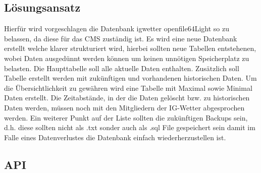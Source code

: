 \subsection{Lösungsansatz}
Hierfür wird vorgeschlagen die Datenbank igwetter openfile64Light so zu belassen, da diese für das CMS zuständig ist. Es wird eine neue Datenbank erstellt welche klarer strukturiert wird, hierbei sollten neue Tabellen entstehenen, wobei Daten ausgedünnt werden können um keinen unnötigen Speicherplatz zu belasten. Die Haupttabelle soll alle aktuelle Daten enthalten. Zusätzlich soll Tabelle erstellt werden mit zukünftigen und vorhandenen historischen Daten. Um die Übersichtlichkeit zu gewähren wird eine Tabelle mit Maximal sowie Minimal Daten erstellt. Die Zeitabstände, in der die Daten gelöscht bzw. zu historischen Daten werden, müssen noch mit den Mitgliedern der IG-Wetter abgesprochen werden. Ein weiterer Punkt auf der Liste sollten die zukünftigen Backups sein, d.h. diese sollten nicht als .txt sonder auch als .sql File gespeichert sein damit im Falle eines Datenverlustes die Datenbank einfach wiederherzustellen ist.

\subsection{API}



